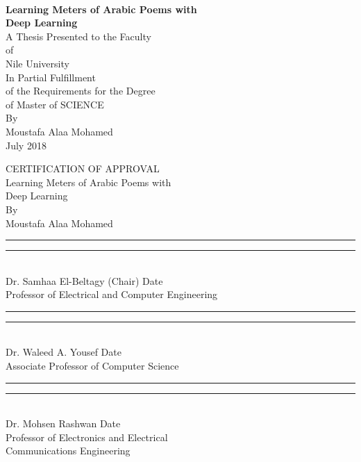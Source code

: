 \thispagestyle{empty}
\begin{centering}
\large{\textbf{\\[1cm]{Learning Meters of Arabic Poems with \\ Deep Learning}}}\\[5cm]
\normalsize{}
A Thesis Presented to the Faculty\\
 of\\
 Nile University\\[5cm]
In Partial Fulfillment\\
of the Requirements for the Degree\\
of Master of SCIENCE\\[3cm]
By\\
Moustafa Alaa Mohamed\\
July 2018\\
\end{centering}
\normalsize{}



\newpage 
\thispagestyle{empty}
\begin{centering}
\normalsize{}
CERTIFICATION OF APPROVAL\\[3cm]
Learning Meters of Arabic Poems with \\ Deep Learning\\[4cm]
 By\\
Moustafa Alaa Mohamed\\[4cm]
\end{centering}

\hspace{-1.7em}
\rule[0em]{22em}{0.5pt} \hfill \rule[0em]{14em}{0.5pt} \\
\hspace{1em}
Dr. Samhaa El-Beltagy	(Chair)	\hspace{36em} Date\\
Professor of Electrical and Computer Engineering \\[1cm]
\hspace{1em}
\rule[0em]{22em}{0.5pt} \hfill \rule[0em]{14em}{0.5pt} \\
\hspace{1em}
Dr. Waleed A. Yousef \hspace{40em}  Date\\
Associate Professor of Computer Science \\[1cm]
\hspace{1em}
\hspace{1em}
\rule[0em]{22em}{0.5pt} \hfill \rule[0em]{14em}{0.5pt} \\
\hspace{1em}
Dr. Mohsen Rashwan \hspace{39.5em}  Date\\
Professor of Electronics and Electrical\\ Communications Engineering\\[1cm]
\hspace{1em}

\normalsize{}
\newpage 
{} 

\renewcommand{\contentsname}{\uppercase{Table of Contents}}


